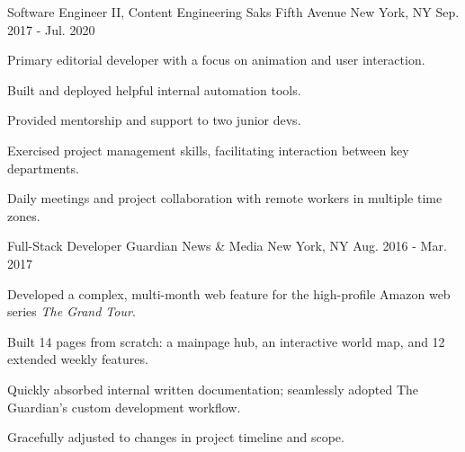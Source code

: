 

\begin{cventries}

  \cventry
    {Software Engineer II, Content Engineering} %
    {Saks Fifth Avenue} %
    {New York, NY} %
    {Sep. 2017 - Jul. 2020} %
    {
      \begin{cvitems} %
       \item {Primary editorial developer with a focus on animation and user interaction.}
       \item {Built and deployed helpful internal automation tools.}
	   \item {Provided mentorship and support to two junior devs.}
	   \item {Exercised project management skills, facilitating interaction between key departments.}
	   \item {Daily meetings and project collaboration with remote workers in multiple time zones.} 
      \end{cvitems}
    }

  \cventry
    {Full-Stack Developer} %
    {Guardian News \& Media} %
    {New York, NY} %
    {Aug. 2016 - Mar. 2017} %
    {
      \begin{cvitems} %
        \item {Developed a complex, multi-month web feature for the high-profile Amazon web series \textit{The Grand Tour}.}
        \item {Built 14 pages from scratch: a mainpage hub, an interactive world map, and 12 extended weekly features.}
        \item {Quickly absorbed internal written documentation; seamlessly adopted The Guardian’s custom development workflow.}
        \item {Gracefully adjusted to changes in project timeline and scope.}
      \end{cvitems}
    }


\end{cventries}
